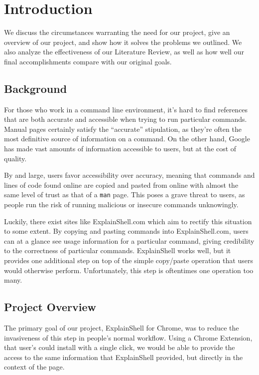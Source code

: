\documentclass[11pt]{article}
\begin{document}
\tableofcontents

\newpage

\section{Introduction}

We discuss the circumstances warranting the need for our project, give an
overview of our project, and show how it solves the problems we outlined. We
also analyze the effectiveness of our Literature Review, as well as how well our
final accomplishments compare with our original goals.

\subsection{Background}

For those who work in a command line environment, it's hard to find references
that are both accurate and accessible when trying to run particular commands.
Manual pages certainly satisfy the ``accurate'' stipulation, as they're often
the most definitive source of information on a command. On the other hand,
Google has made vast amounts of information accessible to users, but at the cost
of quality.

By and large, users favor accessibility over accuracy, meaning that commands and
lines of code found online are copied and pasted from online with almost the
same level of trust as that of a \texttt{man} page. This poses a grave threat to
users, as people run the risk of running malicious or insecure commands
unknowingly.

Luckily, there exist sites like ExplainShell.com which aim to rectify this
situation to some extent. By copying and pasting commands into ExplainShell.com,
users can at a glance see usage information for a particular command, giving
credibility to the correctness of particular commands. ExplainShell works well,
but it provides one additional step on top of the simple copy/paste operation
that users would otherwise perform. Unfortunately, this step is oftentimes one
operation too many.

\subsection{Project Overview}

The primary goal of our project, ExplainShell for Chrome, was to reduce the
invasiveness of this step in people's normal workflow. Using a Chrome Extension,
that user's could install with a single click, we would be able to provide the
access to the same information that ExplainShell provided, but directly in the
context of the page.
\end{document}
